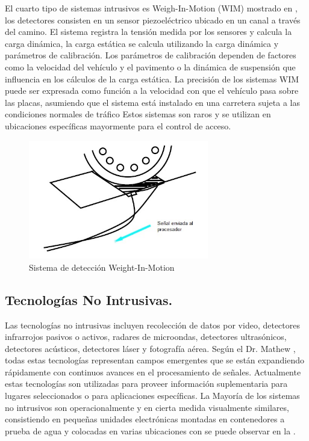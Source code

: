 El cuarto tipo de sistemas intrusivos es Weigh-In-Motion (WIM) mostrado en , los detectores consisten en un sensor piezoeléctrico ubicado en un canal a través del camino. El sistema registra la tensión medida por los sensores y calcula la carga dinámica, la carga estática se calcula utilizando la carga dinámica y parámetros de calibración. Los parámetros de calibración dependen de factores como la velocidad del vehículo y el pavimento o la dinámica de suspensión que influencia en los cálculos de la carga estática. La precisión de los sistemas WIM puede ser expresada como función a la velocidad con que el vehículo pasa sobre las placas, asumiendo que el sistema está instalado en una carretera sujeta a las condiciones normales de tráfico Estos sistemas son raros y se utilizan en ubicaciones específicas mayormente para el control de acceso.

\begin{figure}[h]
	\centering
	\includegraphics[width=0.7\textwidth]{capitulos/3/figuras/figura2.jpg}
	\caption{\label{fig:Weight-In-Motion}  Sistema de detección Weight-In-Motion}	
\end{figure}

\subsection{Tecnologías No Intrusivas.}

Las tecnologías no intrusivas incluyen recolección de datos por video, detectores infrarrojos pasivos o activos, radares de microondas, detectores ultrasónicos, detectores acústicos, detectores láser y fotografía aérea. Según el Dr. Mathew \cite{mathew2014transportation}, todas estas tecnologías representan campos emergentes que se están expandiendo rápidamente con continuos avances en el procesamiento de señales. Actualmente estas tecnologías son utilizadas para proveer información suplementaria para lugares seleccionados o para aplicaciones específicas. La Mayoría de los sistemas no intrusivos son operacionalmente y en cierta medida visualmente similares, consistiendo en pequeñas unidades electrónicas montadas en contenedores a prueba de agua y colocadas en varias ubicaciones con se puede observar en la .

